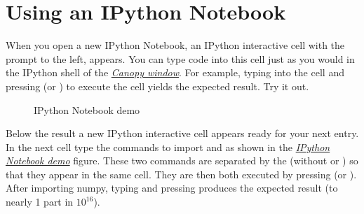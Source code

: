 \documentclass[letterpaper,10pt,english]{sphinxmanual}
\begin{document}
\section{Using an IPython Notebook}
\label{apdx2/apdx2_ipynb:using-an-ipython-notebook}
When you open a new IPython Notebook, an IPython interactive cell with the prompt  to the left, appears.  You can type code into this cell just as you would in the IPython shell of the {\hyperref[chap2/chap2_basics:fig-canopywindow]{\emph{Canopy window}}}.  For example, typing  into the cell and pressing  (or ) to execute the cell yields the expected result.  Try it out.
\begin{figure}[htbp]
\centering
\capstart

\caption{IPython Notebook demo}\label{apdx2/apdx2_ipynb:fig-firstipynbcells}\end{figure}

Below the result a new IPython interactive cell appears ready for your next entry.  In the next cell type the commands to import  and  as shown in the {\hyperref[apdx2/apdx2_ipynb:fig-firstipynbcells]{\emph{IPython Notebook demo}}} figure.  These two commands are separated by the  (without  or ) so that they appear in the same cell.  They are then both executed by pressing  (or ).  After importing numpy, typing  and pressing  produces the expected result (to nearly 1 part in \(10^{16}\)).
\end{document}
